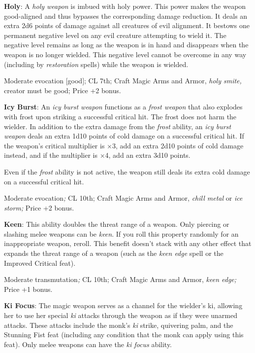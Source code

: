 \textbf{Holy}: A \textit{holy weapon} is imbued with holy power. This power makes the weapon good-aligned and thus bypasses the corresponding damage reduction. It deals an extra 2d6 points of damage against all creatures of evil alignment. It bestows one permanent negative level on any evil creature attempting to wield it. The negative level remains as long as the weapon is in hand and disappears when the weapon is no longer wielded. This negative level cannot be overcome in any way (including by \textit{restoration }spells) while the weapon is wielded.
				
Moderate evocation \mbox{$[$}good\mbox{$]$}; CL 7th; Craft Magic Arms and Armor, \textit{holy smite, }creator must be good; Price +2 bonus.
				
\textbf{Icy Burst}: An \textit{icy burst weapon} functions as a \textit{frost weapon} that also explodes with frost upon striking a successful critical hit. The frost does not harm the wielder. In addition to the extra damage from the \textit{frost} ability, an \textit{icy burst weapon} deals an extra 1d10 points of cold damage on a successful critical hit. If the weapon's critical multiplier is \mbox{$\times$}3, add an extra 2d10 points of cold damage instead, and if the multiplier is \mbox{$\times$}4, add an extra 3d10 points. 
				
Even if the \textit{frost} ability is not active, the weapon still deals its extra cold damage on a successful critical hit.
				
Moderate evocation\textit{; }CL 10th; Craft Magic Arms and Armor, \textit{chill metal }or \textit{ice storm; }Price +2 bonus.
				
\textbf{Keen}: This ability doubles the threat range of a weapon. Only piercing or slashing melee weapons can be \textit{keen}. If you roll this property randomly for an inappropriate weapon, reroll. This benefit doesn't stack with any other effect that expands the threat range of a weapon (such as the \textit{keen edge }spell or the Improved Critical feat).
				
Moderate transmutation\textit{; }CL 10th; Craft Magic Arms and Armor, \textit{keen edge; }Price +1 bonus.
				
\textbf{Ki Focus}: The magic weapon serves as a channel for the wielder's ki, allowing her to use her special \textit{ki }attacks through the weapon as if they were unarmed attacks. These attacks include the monk's \textit{ki }strike, quivering palm, and the Stunning Fist feat (including any condition that the monk can apply using this feat). Only melee weapons can have the \textit{ki focus} ability.
				

